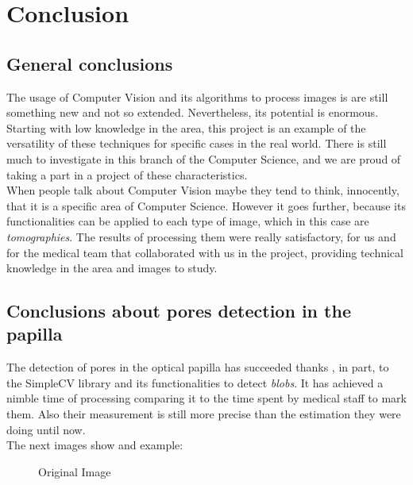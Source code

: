 \chapter{Conclusion}
\section{General conclusions}
The usage of Computer Vision and its algorithms to process images is are
still something new and not so extended. Nevertheless, its potential is
enormous. Starting with low knowledge in the area, this project is an
example of the versatility of these techniques for specific cases in
the real world. There is still much to investigate in this branch
of the Computer Science, and we are proud of taking a part in a project
of these characteristics.\\
When people talk about Computer Vision maybe they tend to think,
innocently, that it is a specific area of Computer Science. However
it goes further, because its functionalities can be applied to each
type of image, which in this case are \emph{tomographies}.
The results of processing them were really satisfactory, for us and
for the medical team that collaborated with us in the project, 
providing technical knowledge in the area and images to study.

\section{Conclusions about pores detection in the papilla}
The detection of pores in the optical papilla has succeeded thanks
, in part, to the SimpleCV library and its functionalities to detect 
\emph{blobs}. It has achieved a nimble time of processing comparing
it to the time spent by medical staff to mark them. Also their 
measurement is still more precise than the estimation they were doing
until now. \\
The next images show and example:

    \begin{figure}[H]
      \caption{Original Image}
      \centering \setlength\fboxsep{0pt} \setlength\fboxrule{0.5pt}
    \end{figure}

